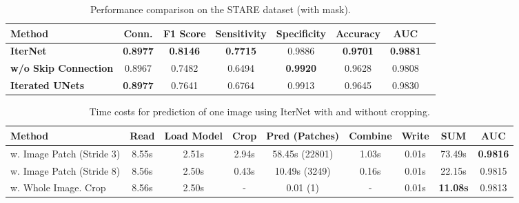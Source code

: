 \documentclass[10pt,twocolumn,letterpaper]{article}
\begin{document}
\begin{table*}
	\caption{Performance comparison on the STARE dataset (with mask).}
	\label{table_detect_performance_stare1}
	\centering
	\begin{tabular}{l|ccccccc}
		\hline
		Method  & Conn. & F1 Score & Sensitivity & Specificity & Accuracy & AUC\\ 
		\hline
		
		\textbf{IterNet} &\textbf{0.8977}&  \textbf{0.8146} &  \textbf{0.7715} & 0.9886 & \textbf{0.9701}& \textbf{0.9881}\\
		\textbf{w/o Skip Connection} & 0.8967 & 0.7482 & 0.6494 & \textbf{0.9920} & 0.9628& 0.9808\\
		\textbf{Iterated UNets } & \textbf{0.8977} &  0.7641 & 0.6764 & 0.9913 & 0.9645 & 0.9830\\
		
		\hline
	\end{tabular}
\end{table*}


\begin{table*}
	\caption{Time costs for prediction of one image using IterNet with and without cropping.}
	\label{table_time_costs}
	\centering
	\begin{tabular}{l|cccccc|c|c}
		\hline
		Method  & Read  & Load Model & Crop & Pred (Patches) & Combine & Write & SUM & AUC\\ 
		\hline
		w. Image Patch (Stride 3) & 8.55s & 2.51s & 2.94s & 58.45s (22801) & 1.03s &  0.01s & 73.49s &\textbf{0.9816}\\
		w. Image Patch (Stride 8) & 8.56s & 2.50s & 0.43s & 10.49s (3249) & 0.16s &  0.01s & 22.15s &0.9815\\
		w. Whole Image. Crop & 8.56s & 2.50s &- & 0.01 (1) & - & 0.01s & \textbf{11.08s} &0.9813\\
		\hline
		
		
		\hline
	\end{tabular}
\end{table*}
\end{document}
